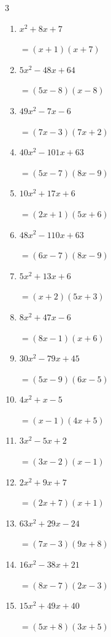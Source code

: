 \begin{multicols}{3}
\begin{enumerate}
        $=(x-1)^{2}$

  \item $x^{2}+8x+7$

        $=(x+1)(x+7)$

  \item $5x^{2}-48x+64$

        $=(5x-8)(x-8)$

  \item $49x^{2}-7x-6$

        $=(7x-3)(7x+2)$

  \item $40x^{2}-101x+63$

        $=(5x-7)(8x-9)$

  \item $10x^{2}+17x+6$

        $=(2x+1)(5x+6)$

\columnbreak %

  \item $48x^{2}-110x+63$

        $=(6x-7)(8x-9)$

  \item $5x^{2}+13x+6$

        $=(x+2)(5x+3)$

  \item $8x^{2}+47x-6$

        $=(8x-1)(x+6)$

  \item $30x^{2}-79x+45$

        $=(5x-9)(6x-5)$

  \item $4x^{2}+x-5$

        $=(x-1)(4x+5)$

  \item $3x^{2}-5x+2$

        $=(3x-2)(x-1)$

  \item $2x^{2}+9x+7$

        $=(2x+7)(x+1)$

  \item $63x^{2}+29x-24$

        $=(7x-3)(9x+8)$

  \item $16x^{2}-38x+21$

        $=(8x-7)(2x-3)$

  \item $15x^{2}+49x+40$

        $=(5x+8)(3x+5)$


\end{enumerate}
\end{multicols}
